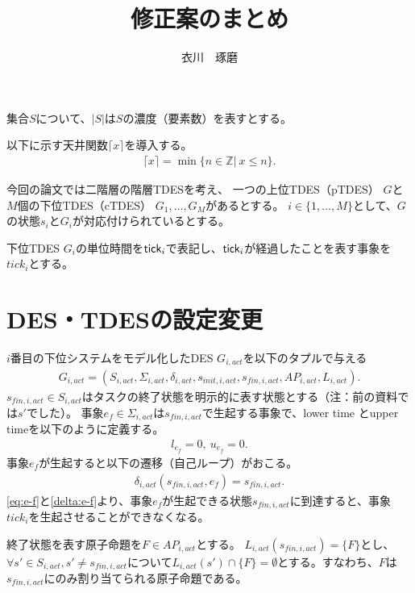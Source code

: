 \documentclass[ 10pt]{jsarticle}
\title{修正案のまとめ}
\author{衣川　琢磨}
\newcommand{\req}[1]{\eqref{#1}}
\newcommand{\tick}{{\sf tick}}
\begin{document}
\maketitle
集合$S$について、$|S|$は$S$の濃度（要素数）を表すとする。

以下に示す天井関数$\lceil x \rceil$を導入する。
\begin{align}
\lceil x \rceil =\min\{n\in\mathbb{Z}|\ x\leq n\}.
\end{align}

今回の論文では二階層の階層TDESを考え、
一つの上位TDES（pTDES） $G$と$M$個の下位TDES（cTDES） $G_1,\ldots,G_M$があるとする。
$i\in\{1,\ldots,M\}$として、$G$の状態$s_i$と$G_i$が対応付けられているとする。

下位TDES $G_i$の単位時間を$\tick_i$で表記し、$\tick_i$が経過したことを表す事象を$\textit{tick}_i$とする。

%
%
\section{DES・TDESの設定変更}

$i$番目の下位システムをモデル化したDES $G_{i,\textit{act}}$を以下のタプルで与える
\begin{align}
G_{i,\textit{act}}=(S_{i,\textit{act}},\Sigma_{i,\textit{act}},\delta_{i,\textit{act}},s_{\textit{init},i,\textit{act}},s_{\textit{fin},i,\textit{act}},\textit{AP}_{i,\textit{act}},L_{i,\textit{act}}).
\end{align}
$s_{\textit{fin},i,\textit{act}}\in S_{i,\textit{act}}$はタスクの終了状態を明示的に表す状態とする（注：前の資料では$s'$でした）。
事象$e_f\in\Sigma_{i,\textit{act}} $は$s_{\textit{fin},i,\textit{act}}$で生起する事象で、lower time とupper timeを以下のように定義する。
\begin{align}
l_{e_f}=0,\ u_{e_f}=0.\label{eq:e-f}
\end{align}
%
事象$e_f$が生起すると以下の遷移（自己ループ）がおこる。
\begin{align}
\delta_{i,act}(s_{\textit{fin},i,\textit{act}},e_f)=s_{\textit{fin},i,\textit{act}}.\label{delta:e-f}
\end{align}
\req{eq:e-f}と\req{delta:e-f}より、事象$e_f$が生起できる状態$s_{\textit{fin},i,\textit{act}}$に到達すると、事象$\textit{tick}_i$を生起させることができなくなる。

終了状態を表す原子命題を$F\in \textit{AP}_{i,\textit{act}}$とする。
$L_{i,\textit{act}}(s_{\textit{fin},i,\textit{act}})=\{F\}$とし、$\forall s'\in S_{i,\textit{act}},s'\neq s_{\textit{fin},i,\textit{act}}$について$L_{i,\textit{act}}(s') \cap \{F\}=\emptyset$とする。すなわち、$F$は$s_{\textit{fin},i,\textit{act}}$にのみ割り当てられる原子命題である。
\end{document}

